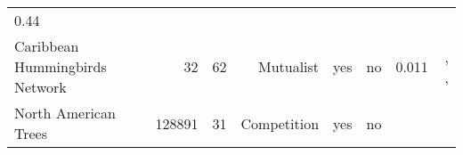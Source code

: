 \begin{longtable}[]{@{}lrrrrrrr@{}}
\begin{minipage}[t]{0.06\columnwidth}
0.44\strut
\end{minipage} & \begin{minipage}[t]{0.22\columnwidth}\raggedleft\strut
\citet{Baiser_2011}\strut
\end{minipage}\tabularnewline
\begin{minipage}[t]{0.15\columnwidth}\raggedright\strut
Caribbean Hummingbirds Network\strut
\end{minipage} & \begin{minipage}[t]{0.07\columnwidth}\raggedleft\strut
32\strut
\end{minipage} & \begin{minipage}[t]{0.07\columnwidth}\raggedleft\strut
62\strut
\end{minipage} & \begin{minipage}[t]{0.11\columnwidth}\raggedleft\strut
Mutualist\strut
\end{minipage} & \begin{minipage}[t]{0.05\columnwidth}\raggedleft\strut
yes\strut
\end{minipage} & \begin{minipage}[t]{0.04\columnwidth}\raggedleft\strut
no\strut
\end{minipage} & \begin{minipage}[t]{0.06\columnwidth}\raggedleft\strut
0.011\strut
\end{minipage} & \begin{minipage}[t]{0.22\columnwidth}\raggedleft\strut
\citet{MartinGonzalez2015}, \citet{Sonne2016}, \citet{Lack1973}\strut
\end{minipage}\tabularnewline
\begin{minipage}[t]{0.15\columnwidth}\raggedright\strut
North American Trees\strut
\end{minipage} & \begin{minipage}[t]{0.07\columnwidth}\raggedleft\strut
128891\strut
\end{minipage} & \begin{minipage}[t]{0.07\columnwidth}\raggedleft\strut
31\strut
\end{minipage} & \begin{minipage}[t]{0.11\columnwidth}\raggedleft\strut
Competition\strut
\end{minipage} & \begin{minipage}[t]{0.05\columnwidth}\raggedleft\strut
yes\strut
\end{minipage} & \begin{minipage}[t]{0.04\columnwidth}\raggedleft\strut
no\strut

\end{minipage}
\end{longtable}
